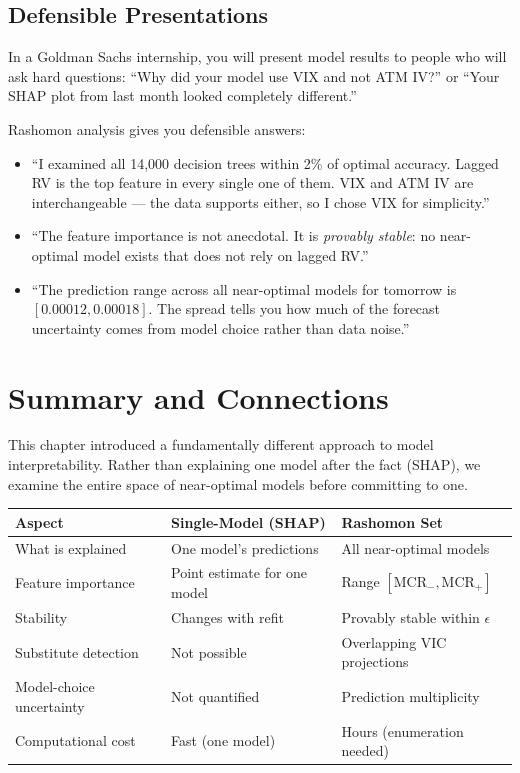 \subsection{Defensible Presentations}

In a Goldman Sachs internship, you will present model results to people who
will ask hard questions: ``Why did your model use VIX and not ATM IV?'' or
``Your SHAP plot from last month looked completely different.''

Rashomon analysis gives you defensible answers:

\begin{itemize}[leftmargin=1.8em]
  \item ``I examined all 14{,}000 decision trees within 2\% of optimal
    accuracy.  Lagged RV is the top feature in every single one of them.
    VIX and ATM IV are interchangeable --- the data supports either, so I
    chose VIX for simplicity.''
  \item ``The feature importance is not anecdotal.  It is \emph{provably
    stable}: no near-optimal model exists that does not rely on lagged RV.''
  \item ``The prediction range across all near-optimal models for tomorrow is
    $[0.00012, 0.00018]$.  The spread tells you how much of the forecast
    uncertainty comes from model choice rather than data noise.''
\end{itemize}


\section{Summary and Connections}\label{sec:rashomon:summary}

This chapter introduced a fundamentally different approach to model
interpretability.  Rather than explaining one model after the fact (SHAP), we
examine the entire space of near-optimal models before committing to one.

\begin{center}
\begin{tabular}{p{4.2cm}p{4.8cm}p{4.8cm}}
\toprule
\textbf{Aspect} & \textbf{Single-Model (SHAP)} & \textbf{Rashomon Set} \\
\midrule
What is explained & One model's predictions & All near-optimal models \\
Feature importance & Point estimate for one model & Range $[\text{MCR}_{-}, \text{MCR}_{+}]$ \\
Stability & Changes with refit & Provably stable within $\epsilon$ \\
Substitute detection & Not possible & Overlapping VIC projections \\
Model-choice uncertainty & Not quantified & Prediction multiplicity \\
Computational cost & Fast (one model) & Hours (enumeration needed) \\
\bottomrule
\end{tabular}
\end{center}

